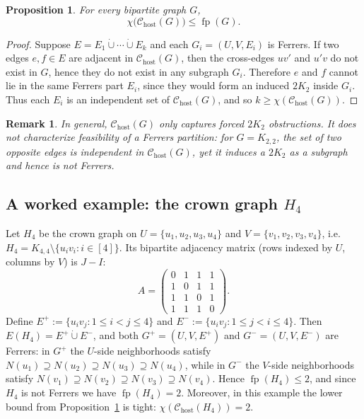 \documentclass[12pt]{amsart}
\newtheorem{proposition}{Proposition}
\newtheorem{remark}[theorem]{Remark}
\newcommand{\fp}{\operatorname{fp}}
\begin{document}
\begin{proposition}\label{prop:conflict-lb}
For every bipartite graph $G$,
\[
\chi\big(\mathcal C_{\mathrm{host}}(G)\big)\le \fp(G).
\]
\end{proposition}

\begin{proof}
Suppose $E=E_1\dot\cup\cdots\dot\cup E_k$ and each $G_i=(U,V,E_i)$ is Ferrers.
If two edges $e,f\in E$ are adjacent in $\mathcal C_{\mathrm{host}}(G)$, then the cross-edges $uv'$ and $u'v$ do not exist in $G$, hence they do not exist in any subgraph $G_i$.
Therefore $e$ and $f$ cannot lie in the same Ferrers part $E_i$, since they would form an induced $2K_2$ inside $G_i$.
Thus each $E_i$ is an independent set of $\mathcal C_{\mathrm{host}}(G)$, and so $k\ge \chi(\mathcal C_{\mathrm{host}}(G))$.
\end{proof}

\begin{remark}\label{rem:conflict-not-characterization}
In general, $\mathcal C_{\mathrm{host}}(G)$ only captures \emph{forced} $2K_2$ obstructions.
It does \emph{not} characterize feasibility of a Ferrers partition: for $G=K_{2,2}$, the set of two opposite edges is independent in $\mathcal C_{\mathrm{host}}(G)$,
yet it induces a $2K_2$ as a subgraph and hence is not Ferrers.
\end{remark}

\subsection{A worked example: the crown graph $H_4$}

Let $H_4$ be the crown graph on $U=\{u_1,u_2,u_3,u_4\}$ and $V=\{v_1,v_2,v_3,v_4\}$, i.e.\ $H_4=K_{4,4}\setminus\{u_iv_i:i\in[4]\}$.
Its bipartite adjacency matrix (rows indexed by $U$, columns by $V$) is $J-I$:
\[
A=
\begin{pmatrix}
0&1&1&1\\
1&0&1&1\\
1&1&0&1\\
1&1&1&0
\end{pmatrix}.
\]
Define $ E^+ := \{u_iv_j : 1\le i<j\le 4\}$ and
$E^- := \{u_iv_j : 1\le j<i\le 4\}$.
Then $E(H_4)=E^+\dot\cup E^-$, and both $G^+=(U,V,E^+)$ and $G^-=(U,V,E^-)$ are Ferrers:
in $G^+$ the $U$-side neighborhoods satisfy
$N(u_1)\supseteq N(u_2)\supseteq N(u_3)\supseteq N(u_4)$,
while in $G^-$ the $V$-side neighborhoods satisfy
$N(v_1)\supseteq N(v_2)\supseteq N(v_3)\supseteq N(v_4)$.
Hence $\fp(H_4)\le 2$, and since $H_4$ is not Ferrers we have $\fp(H_4)=2$.
Moreover, in this example the lower bound from Proposition~\ref{prop:conflict-lb} is tight: $\chi(\mathcal C_{\mathrm{host}}(H_4))=2$.
\end{document}
